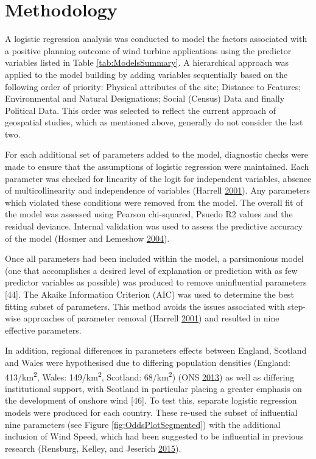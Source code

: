 \documentclass[a4paper,]{article}
\theoremstyle{definition}
\theoremstyle{definition}
\theoremstyle{remark}
\begin{document}
{\section{Methodology}\label{methodology}

A logistic regression analysis was conducted to model the factors
associated with a positive planning outcome of wind turbine applications
using the predictor variables listed in Table \ref{tab:ModelsSummary}. A
hierarchical approach was applied to the model building by adding
variables sequentially based on the following order of priority:
Physical attributes of the site; Distance to Features; Environmental and
Natural Designations; Social (Census) Data and finally Political Data.
This order was selected to reflect the current approach of geospatial
studies, which as mentioned above, generally do not consider the last
two.

For each additional set of parameters added to the model, diagnostic
checks were made to ensure that the assumptions of logistic regression
were maintained. Each parameter was checked for linearity of the logit
for independent variables, absence of multicollinearity and independence
of variables (Harrell \protect\hyperlink{ref-Harrell2001}{2001}). Any
parameters which violated these conditions were removed from the model.
The overall fit of the model was assessed using Pearson chi-squared,
Psuedo R2 values and the residual deviance. Internal validation was used
to assess the predictive accuracy of the model (Hosmer and Lemeshow
\protect\hyperlink{ref-Hosmer2004}{2004}).

Once all parameters had been included within the model, a parsimonious
model (one that accomplishes a desired level of explanation or
prediction with as few predictor variables as possible) was produced to
remove uninfluential parameters {[}44{]}. The Akaike Information
Criterion (AIC) was used to determine the best fitting subset of
parameters. This method avoids the issues associated with step-wise
approaches of parameter removal (Harrell
\protect\hyperlink{ref-Harrell2001}{2001}) and resulted in nine
effective parameters.

In addition, regional differences in parameters effects between England,
Scotland and Wales were hypothesised due to differing population
densities (England: 413/km\textsuperscript{2}, Wales:
149/km\textsuperscript{2}, Scotland: 68/km\textsuperscript{2}) (ONS
\protect\hyperlink{ref-ONS2013}{2013}) as well as differing
institutional support, with Scotland in particular placing a greater
emphasis on the development of onshore wind {[}46{]}. To test this,
separate logistic regression models were produced for each country.
These re-used the subset of influential nine parameters (see Figure
\ref{fig:OddsPlotSegmented}) with the additional inclusion of Wind
Speed, which had been suggested to be influential in previous research
(Rensburg, Kelley, and Jeserich
\protect\hyperlink{ref-VanRensburg20}{2015}).

}
\end{document}

